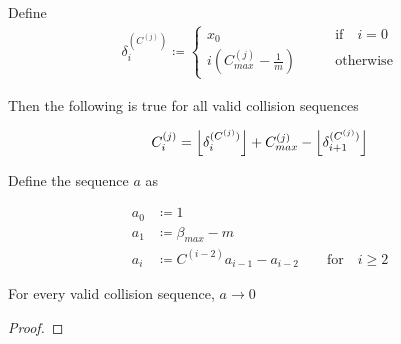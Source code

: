 \begin{theorem}
	Define 
	\begin{align}\label{delta_c}
			\delta^{(C^{(j)})}_i \coloneqq \begin{cases}
				x_0 \qquad &\text{if} \quad i = 0\\
				i (C^{(j)}_{max} - \frac{1}{m}) \qquad &\text{otherwise}
			\end{cases}
	\end{align}

	Then the following is true for all valid collision sequences

	\begin{align}\label{eq:c_i}
		C^{(j)}_i = \floor{\delta^{(C^{(j)})}_i} + C^{(j)}_{max} - \floor{\delta^{(C^{(j)})}_{i+1}}
	\end{align}
\end{theorem} 

\begin{theorem}
	Define the sequence $a$ as

	\begin{align}
		a_0& \coloneqq 1\\
		a_1& \coloneqq \beta_{max} - m\\
		a_i& \coloneqq C^{(i-2)} a_{i-1} - a_{i-2} \qquad \text{for} \quad i \ge 2
	\end{align}

	For every valid collision sequence, $a \to 0$
\end{theorem}

\begin{proof}

\end{proof}